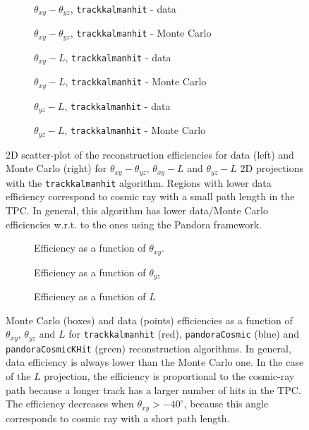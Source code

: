 \documentclass[a4paper]{scrartcl}
\begin{document}
\begin{figure}[htbp]
\begin{subfigure}{0.52\textwidth}
\caption{$\theta_{xy} - \theta_{yz}$, \texttt{trackkalmanhit} - data} \label{fig:2d_tk1}
\end{subfigure}
\begin{subfigure}{0.52\textwidth}
\caption{$\theta_{xy} - \theta_{yz}$, \texttt{trackkalmanhit} - Monte Carlo}\label{fig:2d_tk1_mc}
\end{subfigure}
\begin{subfigure}{0.52\textwidth}
\caption{$\theta_{xy} - L$, \texttt{trackkalmanhit} - data}\label{fig:2d_tk2}
\end{subfigure}
\begin{subfigure}{0.52\textwidth}
\caption{$\theta_{xy} - L$, \texttt{trackkalmanhit} - Monte Carlo}\label{fig:2d_tk2_mc}
\end{subfigure}
\begin{subfigure}{0.52\textwidth}
\caption{$\theta_{yz} - L$, \texttt{trackkalmanhit} - data}\label{fig:2d_tk3}
\end{subfigure}
\begin{subfigure}{0.52\textwidth}
\caption{$\theta_{yz} - L$, \texttt{trackkalmanhit} - Monte Carlo}\label{fig:2d_tk3_mc}
\end{subfigure}
\caption{2D scatter-plot of the reconstruction efficiencies for data (left) and Monte Carlo (right) for $\theta_{xy} - \theta_{yz}$, $\theta_{xy} - L$ and $\theta_{yz} - L$ 2D projections with the \texttt{trackkalmanhit} algorithm. Regions with lower data efficiency correspond to cosmic ray with a small path length in the TPC. In general, this algorithm has lower data/Monte Carlo efficiencies w.r.t. to the ones using the Pandora framework.} \label{fig:2deff_trk}
\end{figure}

\begin{figure}[htbp]
\begin{center}
\begin{subfigure}{0.55\textwidth}
\caption{Efficiency as a function of $\theta_{xy}$.} \label{fig:xy}
\end{subfigure}\begin{subfigure}{0.55\textwidth}
\caption{Efficiency as a function of $\theta_{yz}$}\label{fig:yz}
\end{subfigure}
\begin{subfigure}{0.55\textwidth}
\caption{Efficiency as a function of $L$}\label{fig:l}
\end{subfigure}
\caption{Monte Carlo (boxes) and data (points) efficiencies  as a function of $\theta_{xy}$, $\theta_{yz}$ and $L$ for \texttt{track\-kal\-man\-hit} (red), \texttt{pan\-do\-ra\-Co\-smic} (blue) and \texttt{pan\-do\-ra\-Co\-smicKHit} (green) reconstruction algorithms. In general, data efficiency is always lower than the Monte Carlo one. In the case of the $L$ projection, the efficiency is proportional to the cosmic-ray path because a longer track has a larger number of hits in the TPC. The efficiency decreases when  $\theta_{xy}> -40^{\circ}$, because this angle corresponds to cosmic ray with a short path length.} \label{fig:eff}
\end{center}
\end{figure}
\end{document}
